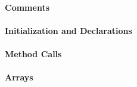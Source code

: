 \paragraph{Comments}
\begin{itemize}
\end{itemize}

\paragraph{Initialization and Declarations}
\begin{itemize}
\end{itemize}

\paragraph{Method Calls}
\begin{itemize}
\end{itemize}

\paragraph{Arrays}
\begin{itemize}
\end{itemize}

